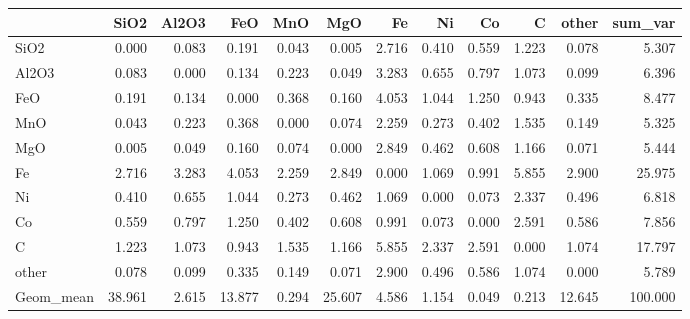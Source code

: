 \begin{tabular}{lrrrrrrrrrrr}
\toprule
{} &    SiO2 &  Al2O3 &     FeO &    MnO &     MgO &     Fe &     Ni &     Co &      C &   other &  sum\_var \\
\midrule
SiO2      &   0.000 &  0.083 &   0.191 &  0.043 &   0.005 &  2.716 &  0.410 &  0.559 &  1.223 &   0.078 &    5.307 \\
Al2O3     &   0.083 &  0.000 &   0.134 &  0.223 &   0.049 &  3.283 &  0.655 &  0.797 &  1.073 &   0.099 &    6.396 \\
FeO       &   0.191 &  0.134 &   0.000 &  0.368 &   0.160 &  4.053 &  1.044 &  1.250 &  0.943 &   0.335 &    8.477 \\
MnO       &   0.043 &  0.223 &   0.368 &  0.000 &   0.074 &  2.259 &  0.273 &  0.402 &  1.535 &   0.149 &    5.325 \\
MgO       &   0.005 &  0.049 &   0.160 &  0.074 &   0.000 &  2.849 &  0.462 &  0.608 &  1.166 &   0.071 &    5.444 \\
Fe        &   2.716 &  3.283 &   4.053 &  2.259 &   2.849 &  0.000 &  1.069 &  0.991 &  5.855 &   2.900 &   25.975 \\
Ni        &   0.410 &  0.655 &   1.044 &  0.273 &   0.462 &  1.069 &  0.000 &  0.073 &  2.337 &   0.496 &    6.818 \\
Co        &   0.559 &  0.797 &   1.250 &  0.402 &   0.608 &  0.991 &  0.073 &  0.000 &  2.591 &   0.586 &    7.856 \\
C         &   1.223 &  1.073 &   0.943 &  1.535 &   1.166 &  5.855 &  2.337 &  2.591 &  0.000 &   1.074 &   17.797 \\
other     &   0.078 &  0.099 &   0.335 &  0.149 &   0.071 &  2.900 &  0.496 &  0.586 &  1.074 &   0.000 &    5.789 \\
Geom\_mean &  38.961 &  2.615 &  13.877 &  0.294 &  25.607 &  4.586 &  1.154 &  0.049 &  0.213 &  12.645 &  100.000 \\
\bottomrule
\end{tabular}
